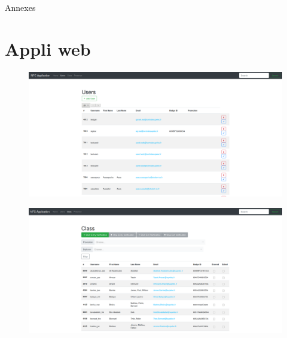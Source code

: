 \documentclass[aspectratio=169]{beamer}
\begin{document}
\appendix


\begin{frame}
  \centering \Huge 
  Annexes
\end{frame}

\section{Appli web}

\begin{frame}
  \begin{figure}
    \centering
    \includegraphics[height=.9\textheight]{../assets/capture_page_users.png}
  \end{figure}
\end{frame}

\begin{frame}
  \begin{figure}
    \centering
    \includegraphics[height=.9\textheight]{../assets/capture_page_class.png}
  \end{figure}
\end{frame}
\end{document}
